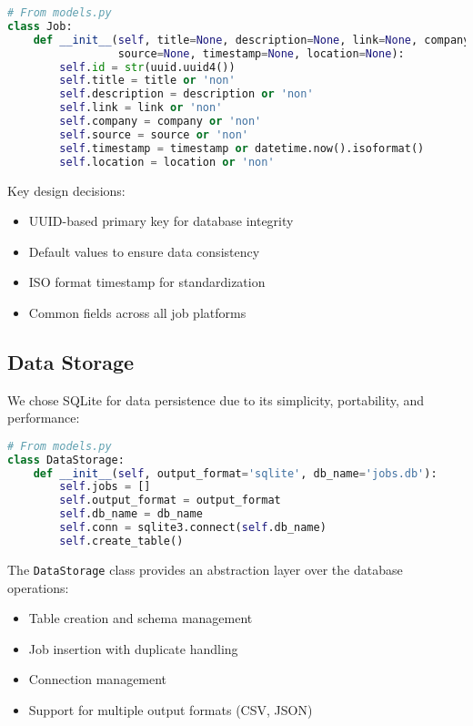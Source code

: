\documentclass[12pt,a4paper]{report}
\begin{document}
\begin{lstlisting}[language=Python, caption=Job Data Model]
# From models.py
class Job:
    def __init__(self, title=None, description=None, link=None, company=None, 
                 source=None, timestamp=None, location=None):
        self.id = str(uuid.uuid4())
        self.title = title or 'non'
        self.description = description or 'non'
        self.link = link or 'non'
        self.company = company or 'non'
        self.source = source or 'non'
        self.timestamp = timestamp or datetime.now().isoformat()
        self.location = location or 'non'
\end{lstlisting}

Key design decisions:
\begin{itemize}
    \item UUID-based primary key for database integrity
    \item Default values to ensure data consistency
    \item ISO format timestamp for standardization
    \item Common fields across all job platforms
\end{itemize}

\subsection{Data Storage}
We chose SQLite for data persistence due to its simplicity, portability, and performance:

\begin{lstlisting}[language=Python, caption=DataStorage Implementation]
# From models.py
class DataStorage:
    def __init__(self, output_format='sqlite', db_name='jobs.db'):
        self.jobs = []
        self.output_format = output_format
        self.db_name = db_name
        self.conn = sqlite3.connect(self.db_name)
        self.create_table()
\end{lstlisting}

The \texttt{DataStorage} class provides an abstraction layer over the database operations:
\begin{itemize}
    \item Table creation and schema management
    \item Job insertion with duplicate handling
    \item Connection management
    \item Support for multiple output formats (CSV, JSON)
\end{itemize}
\end{document}
